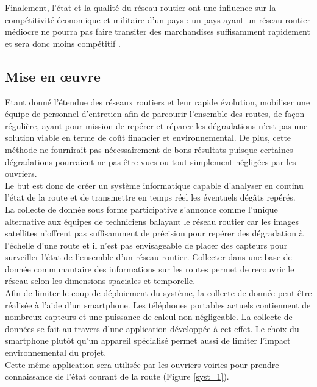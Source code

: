 Finalement, l'état et la qualité du réseau routier ont une influence sur la
compétitivité économique et militaire d'un pays : un pays ayant un réseau
routier médiocre ne pourra pas faire transiter des marchandises suffisamment
rapidement et sera donc moins compétitif \cite{economique}.


\subsection{Mise en \oe{}uvre}
Etant donné l'étendue des réseaux routiers et leur rapide évolution, mobiliser
une équipe de personnel d'entretien afin de parcourir l'ensemble des routes, de
façon régulière, ayant pour mission de repérer et réparer les dégradations
n'est pas une
solution viable en terme de coût financier et environnemental. De plus, cette
méthode ne fournirait pas nécessairement de bons résultats puisque certaines
dégradations pourraient ne pas être vues ou tout simplement négligées par les
ouvriers.\\

Le but est donc de créer un système informatique capable d'analyser en continu
l'état de la
route et de transmettre en temps réel les éventuels dégâts repérés.\\

La collecte de donnée sous forme participative s'annonce comme l'unique
alternative aux équipes de techniciens balayant le réseau routier car les
images satellites
n'offrent pas suffisamment de précision pour repérer des dégradation à
l'échelle d'une route et il n'est pas envisageable de placer des capteurs pour
surveiller l'état de l'ensemble d'un réseau routier. Collecter dans une base de
donnée communautaire des informations sur les routes permet de recouvrir
le réseau selon les dimensions spaciales et temporelle.\\

Afin de limiter le coup de déploiement du système, la collecte de donnée
peut être réalisée à l'aide d'un smartphone. Les téléphones portables
actuels contiennent de nombreux capteurs et une puissance de calcul non
négligeable. La collecte de données se fait au travers d'une
application développée à cet effet. Le choix du smartphone plutôt qu'un
appareil spécialisé permet aussi de limiter l'impact environnemental du
projet.\\
Cette même application sera utilisée par les ouvriers voiries pour prendre
connaissance de l'état courant de la route (Figure \ref{syst_1}).\\


